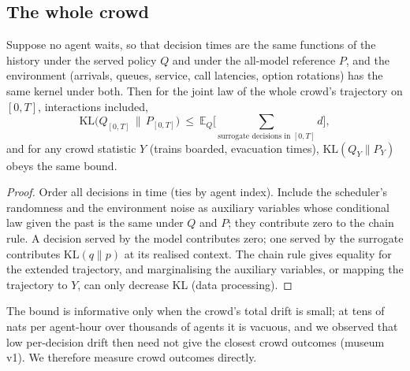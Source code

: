 \subsection{The whole crowd}
\begin{theorem}\label{thm:crowd}
Suppose no agent waits, so that decision times are the same functions of the history under the
served policy $Q$ and under the all-model reference $P$, and the environment (arrivals, queues, service,
call latencies, option rotations) has the same kernel under both. Then for the joint law of the whole
crowd's trajectory on $[0,T]$, interactions included,
\[
  \mathrm{KL}\big(Q_{[0,T]}\,\|\,P_{[0,T]}\big)\ \le\ \mathbb{E}_Q\Big[\sum_{\text{surrogate decisions in }[0,T]} d\Big],
\]
and for any crowd statistic $Y$ (trains boarded, evacuation times),
$\mathrm{KL}(Q_Y\|P_Y)$ obeys the same bound.
\end{theorem}
\begin{proof}
Order all decisions in time (ties by agent index). Include the scheduler's randomness and the
environment noise as auxiliary variables whose conditional law given the past is the same under $Q$
and $P$; they contribute zero to the chain rule. A decision served by the model contributes zero; one
served by the surrogate contributes $\mathrm{KL}(q\|p)$ at its realised context. The chain rule gives
equality for the extended trajectory, and marginalising the auxiliary variables, or mapping the
trajectory to $Y$, can only decrease KL (data processing).
\end{proof}
The bound is informative only when the crowd's total drift is small; at tens of nats per agent-hour
over thousands of agents it is vacuous, and we observed that low per-decision drift then need not give
the closest crowd outcomes (museum v1). We therefore measure crowd outcomes directly.

